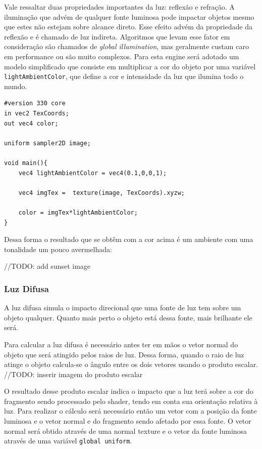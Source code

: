 \documentclass[12pt, 
openright, 
oneside, 
a4paper,    
brazil]{facom-ufu-abntex2}
\begin{document}
Vale ressaltar duas propriedades importantes da luz: reflexão e refração. A iluminação que advém de qualquer fonte luminosa pode impactar objetos mesmo que estes não estejam sobre alcance direto. Esse efeito advém da propriedade da reflexão e é chamado de luz indireta. Algoritmos que levam esse fator em consideração são chamados de \textit{global illumination}, mas geralmente custam caro em performance ou são muito complexos.
Para esta engine será adotado um modelo simplificado que consiste em multiplicar a cor do objeto por uma variável \texttt{lightAmbientColor}, que define a cor e intensidade da luz que ilumina todo o mundo.

\begin{lstlisting}[caption=Fragment Shader com luz ambiente]
#version 330 core
in vec2 TexCoords;
out vec4 color;

uniform sampler2D image;

void main(){
	vec4 lightAmbientColor = vec4(0.1,0,0,1);
	
	vec4 imgTex =  texture(image, TexCoords).xyzw;
	
	color = imgTex*lightAmbientColor;
}
\end{lstlisting}

Dessa forma o resultado que se obtêm com a cor acima é um ambiente com uma tonalidade um pouco avermelhada:

//TODO: add sunset image


\subsubsection{Luz Difusa}
A luz difusa simula o impacto direcional que uma fonte de luz tem sobre um objeto qualquer. Quanto mais perto o objeto está dessa fonte, mais brilhante ele será.

Para calcular a luz difusa é necessário antes ter em mãos o vetor normal do objeto que será atingido pelos raios de luz. Dessa forma, quando o raio de luz atinge o objeto calcula-se o ângulo entre os dois vetores usando o produto escalar.
//TODO: inserir imagem do produto escalar 

O resultado desse produto escalar indica o impacto que a luz terá sobre a cor do fragmento sendo processado pelo shader, tendo em conta sua orientação relativa à luz. Para realizar o cálculo será necessário  então um vetor com a posição da fonte luminosa e o vetor normal e do fragmento sendo afetado por essa fonte.
O vetor normal será obtido através de uma normal texture e o vetor da fonte luminosa através de uma variável \texttt{global uniform}.  
\end{document}
